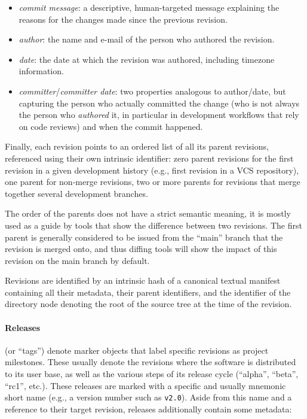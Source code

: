 \begin{itemize}
    \setlength\itemsep{0em}
    \item \emph{commit message}: a descriptive, human-targeted message
        explaining the reasons for the changes made since the previous
        revision.
    \item \emph{author}: the name and e-mail of the person who authored the
        revision.
    \item \emph{date}: the date at which the revision was authored, including
        timezone information.
    \item \emph{committer}/\emph{committer date}: two properties analogous to
        author/date, but capturing the person who actually committed the change
        (who is not always the person who \emph{authored} it, in particular in
        development workflows that rely on code reviews) and when the commit
        happened.
\end{itemize}

Finally, each revision points to an ordered list of all its parent revisions,
referenced using their own intrinsic identifier: zero parent revisions for the
first revision in a given development history (e.g., first revision in a VCS
repository), one parent for non-merge revisions, two or more parents for
revisions that merge together several development branches.

The order of the parents does not have a strict semantic meaning, it is mostly
used as a guide by tools that show the difference between two revisions. The
first parent is generally considered to be issued from the ``main'' branch that
the revision is merged onto, and thus diffing tools will show the impact of
this revision on the main branch by default.

Revisions are identified by an intrinsic hash of a canonical textual
manifest containing all their metadata, their parent identifiers, and the
identifier of the directory node denoting the root of the source tree at the
time of the revision.


\begin{figure}\centering
{}
\end{figure}
\paragraph{\textbf{Releases}} (or ``tags'') denote marker objects that label
specific revisions as project milestones. These usually denote the revisions
where the software is distributed to its user base, as well as the various
steps of its release cycle (``alpha'', ``beta'', ``rc1'', etc.). These releases
are marked with a specific and usually mnemonic short name (e.g., a version
number such as \texttt{v2.0}). Aside from this name and a reference to their
target revision, releases additionally contain some metadata:

